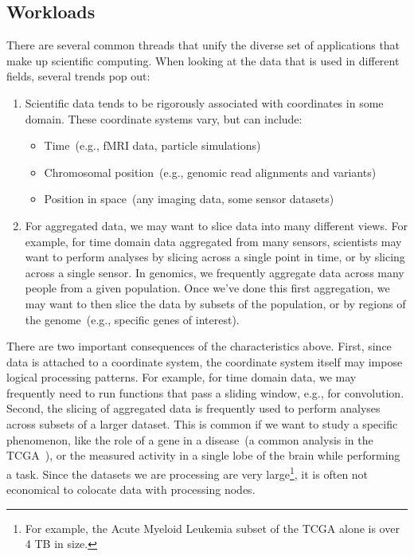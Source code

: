 \documentclass{acm_proc_article-sp}
\begin{document}
\subsection{Workloads}
\label{sec:workloads}

There are several common threads that unify the diverse set of applications that make up scientific
computing. When looking at the data that is used in different fields, several trends pop out:

\begin{enumerate}
\item Scientific data tends to be rigorously associated with coordinates in some domain. These coordinate
systems vary, but can include:
\begin{itemize}
\item Time~(e.g., fMRI data, particle simulations)
\item Chromosomal position~(e.g., genomic read alignments and variants)
\item Position in space~(any imaging data, some sensor datasets)
\end{itemize}
\item For aggregated data, we may want to slice data into many different views. For example, for time
domain data aggregated from many sensors, scientists may want to perform analyses by slicing across a
single point in time, or by slicing across a single sensor. In genomics, we frequently aggregate data across
many people from a given population. Once we've done this first aggregation, we may want to then slice
the data by subsets of the population, or by regions of the genome~(e.g., specific genes of interest).
\end{enumerate}

There are two important consequences of the characteristics above. First, since data is attached to a
coordinate system, the coordinate system itself may impose logical processing patterns. For example, for
time domain data, we may frequently need to run functions that pass a sliding window, e.g., for convolution.
Second, the slicing of aggregated data is frequently used to perform analyses across subsets of a larger
dataset. This is common if we want to study a specific phenomenon, like the role of a gene in a
disease~(a common analysis in the TCGA~\cite{weinstein13}), or the measured activity in a single lobe of
the brain while performing a task. Since the datasets we are processing are very large\footnote{For
example, the Acute Myeloid Leukemia subset of the TCGA alone is over 4 TB in size.}, it is often not
economical to colocate data with processing nodes. 
\end{document}
